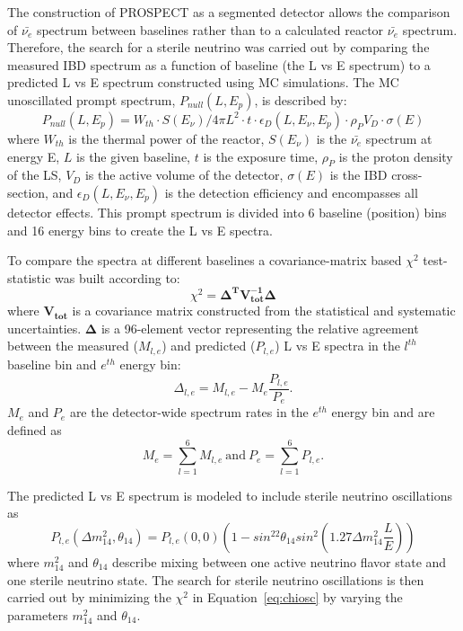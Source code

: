 The construction of PROSPECT as a segmented detector allows the comparison of $\bar{\nu_e}$ spectrum between baselines rather than to a calculated reactor $\bar{\nu_e}$ spectrum. 
Therefore, the search for a sterile neutrino was carried out by comparing the measured IBD spectrum as a function of baseline (the L vs E spectrum) to a predicted L vs E spectrum constructed using MC simulations. 
The MC unoscillated prompt spectrum, $P_{null}(L,E_p)$, is described by:
\begin{equation}
	P_{null}(L,E_p) = W_{th} \cdot S(E_\nu)/4\pi L^2 \cdot t \cdot \epsilon_D(L,E_\nu,E_p) \cdot \rho_PV_D \cdot \sigma(E)
\end{equation}
where $W_{th}$ is the thermal power of the reactor, $S(E_\nu)$ is the $\bar{\nu_{e}}$ spectrum at energy E, $L$ is the given baseline, $t$ is the exposure time, $\rho_P$ is the proton density of the LS, $V_D$ is the active volume of the detector, $\sigma(E)$ is the IBD cross-section, and $\epsilon_D(L,E_\nu,E_p)$ is the detection efficiency and encompasses all detector effects.
This prompt spectrum is divided into 6 baseline (position) bins and 16 energy bins to create the L vs E spectra.

To compare the spectra at different baselines a covariance-matrix based $\chi^2$ test-statistic was built according to:
\begin{equation}	
	\chi^2 = \mathbf{\Delta^TV^{-1}_{tot}\Delta}
	\label{eq:chiosc}
\end{equation}
where $\mathbf{V_{tot}}$ is a covariance matrix constructed from the statistical and systematic uncertainties.
$\mathbf{\Delta}$ is a 96-element vector representing the relative agreement between the measured ($M_{l,e}$) and predicted ($P_{l,e}$) L vs E spectra in the $l^{th}$ baseline bin and $e^{th}$ energy bin:
\begin{equation}
	\Delta_{l,e} = M_{l,e} - M_e\frac{P_{l,e}}{P_e}.
	\label{eq:deltaosc}
\end{equation}
$M_e$ and $P_e$ are the detector-wide spectrum rates in the $e^{th}$ energy bin and are defined as
\begin{equation}
	M_e = \sum_{l=1}^{6}M_{l,e}~\textrm{and}~P_e = \sum_{l=1}^{6}P_{l,e}.
\end{equation}

The predicted L vs E spectrum is modeled to include sterile neutrino oscillations as
\begin{equation}
	P_{l,e}(\Delta m_{14}^2,\theta_{14}) = P_{l,e}(0,0)\left(1-sin^22\theta_{14}sin^2\left(1.27\Delta m_{14}^2\frac{L}{E}   \right)\right)
\end{equation}
where $m_{14}^2$ and $\theta_{14}$ describe mixing between one active neutrino flavor state and one sterile neutrino state.
The search for sterile neutrino oscillations is then carried out by minimizing the $\chi^2$ in Equation~\ref{eq:chiosc} by varying the parameters $m_{14}^2$ and $\theta_{14}$.

